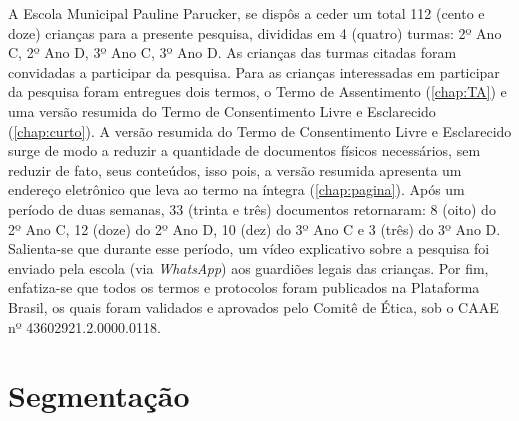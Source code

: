 A Escola Municipal Pauline Parucker, se dispôs a ceder um total 112 (cento e doze) crianças para a presente pesquisa, divididas em 4 (quatro) turmas: 2º Ano C, 2º Ano D, 3º Ano C, 3º Ano D. As crianças das turmas citadas foram convidadas a participar da pesquisa. Para as crianças interessadas em participar da pesquisa foram entregues dois termos, o Termo de Assentimento (\autoref{chap:TA}) e uma versão resumida do Termo de Consentimento Livre e Esclarecido (\autoref{chap:curto}). A versão resumida do Termo de Consentimento Livre e Esclarecido surge de modo a reduzir a quantidade de documentos físicos necessários, sem reduzir de fato, seus conteúdos, isso pois, a versão resumida apresenta um endereço eletrônico que leva ao termo na íntegra (\autoref{chap:pagina}). Após um período de duas semanas, 33 (trinta e três) documentos retornaram: 8 (oito) do 2º Ano C, 12 (doze) do 2º Ano D, 10 (dez) do 3º Ano C e 3 (três) do 3º Ano D. Salienta-se que durante esse período, um vídeo explicativo sobre a pesquisa foi enviado pela escola (via \textit{WhatsApp}) aos guardiões legais das crianças. Por fim, enfatiza-se que todos os termos e protocolos foram publicados na Plataforma Brasil, os quais foram validados e aprovados pelo Comitê de Ética, sob o \ac{CAAE} nº 43602921.2.0000.0118.



\section{Segmentação}\label{sec:seg}

